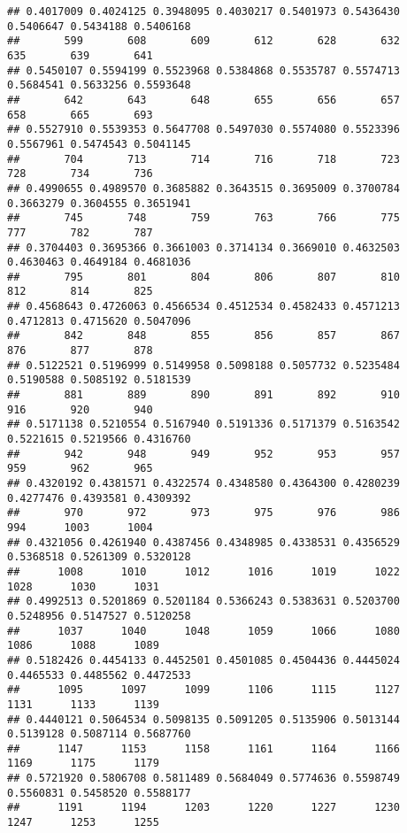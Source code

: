 \documentclass{article}\usepackage[]{graphicx}\usepackage[]{xcolor}
\makeatletter
\newenvironment{kframe}{%
 \def\at@end@of@kframe{}%
 \ifinner\ifhmode%
  \def\at@end@of@kframe{\end{minipage}}%
  \begin{minipage}{\columnwidth}%
 \fi\fi%
 \def\FrameCommand##1{\hskip\@totalleftmargin \hskip-\fboxsep
 \colorbox{shadecolor}{##1}\hskip-\fboxsep
     \hskip-\linewidth \hskip-\@totalleftmargin \hskip\columnwidth}%
 \MakeFramed {\advance\hsize-\width
   \@totalleftmargin\z@ \linewidth\hsize
   \@setminipage}}%
 {\par\unskip\endMakeFramed%
 \at@end@of@kframe}
\newenvironment{knitrout}{}{} %
\makeatother
\begin{document}
\begin{knitrout}
\begin{kframe}
\begin{verbatim}
## 0.4017009 0.4024125 0.3948095 0.4030217 0.5401973 0.5436430 0.5406647 0.5434188 0.5406168 
##       599       608       609       612       628       632       635       639       641 
## 0.5450107 0.5594199 0.5523968 0.5384868 0.5535787 0.5574713 0.5684541 0.5633256 0.5593648 
##       642       643       648       655       656       657       658       665       693 
## 0.5527910 0.5539353 0.5647708 0.5497030 0.5574080 0.5523396 0.5567961 0.5474543 0.5041145 
##       704       713       714       716       718       723       728       734       736 
## 0.4990655 0.4989570 0.3685882 0.3643515 0.3695009 0.3700784 0.3663279 0.3604555 0.3651941 
##       745       748       759       763       766       775       777       782       787 
## 0.3704403 0.3695366 0.3661003 0.3714134 0.3669010 0.4632503 0.4630463 0.4649184 0.4681036 
##       795       801       804       806       807       810       812       814       825 
## 0.4568643 0.4726063 0.4566534 0.4512534 0.4582433 0.4571213 0.4712813 0.4715620 0.5047096 
##       842       848       855       856       857       867       876       877       878 
## 0.5122521 0.5196999 0.5149958 0.5098188 0.5057732 0.5235484 0.5190588 0.5085192 0.5181539 
##       881       889       890       891       892       910       916       920       940 
## 0.5171138 0.5210554 0.5167940 0.5191336 0.5171379 0.5163542 0.5221615 0.5219566 0.4316760 
##       942       948       949       952       953       957       959       962       965 
## 0.4320192 0.4381571 0.4322574 0.4348580 0.4364300 0.4280239 0.4277476 0.4393581 0.4309392 
##       970       972       973       975       976       986       994      1003      1004 
## 0.4321056 0.4261940 0.4387456 0.4348985 0.4338531 0.4356529 0.5368518 0.5261309 0.5320128 
##      1008      1010      1012      1016      1019      1022      1028      1030      1031 
## 0.4992513 0.5201869 0.5201184 0.5366243 0.5383631 0.5203700 0.5248956 0.5147527 0.5120258 
##      1037      1040      1048      1059      1066      1080      1086      1088      1089 
## 0.5182426 0.4454133 0.4452501 0.4501085 0.4504436 0.4445024 0.4465533 0.4485562 0.4472533 
##      1095      1097      1099      1106      1115      1127      1131      1133      1139 
## 0.4440121 0.5064534 0.5098135 0.5091205 0.5135906 0.5013144 0.5139128 0.5087114 0.5687760 
##      1147      1153      1158      1161      1164      1166      1169      1175      1179 
## 0.5721920 0.5806708 0.5811489 0.5684049 0.5774636 0.5598749 0.5560831 0.5458520 0.5588177 
##      1191      1194      1203      1220      1227      1230      1247      1253      1255 

\end{verbatim}
\end{kframe}
\end{knitrout}
\end{document}
